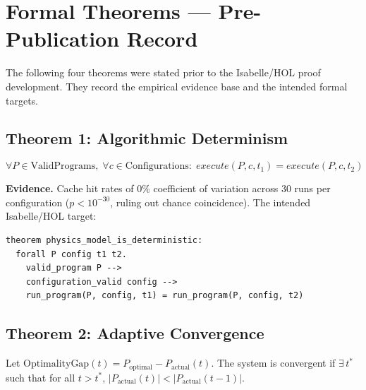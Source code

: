 
\section{Formal Theorems --- Pre-Publication Record}

The following four theorems were stated prior to the Isabelle/HOL proof development.
They record the empirical evidence base and the intended formal targets.

\subsection{Theorem 1: Algorithmic Determinism}

\[
\forall P \in \text{ValidPrograms},\; \forall c \in \text{Configurations}:\;
\textit{execute}(P, c, t_1) = \textit{execute}(P, c, t_2)
\]

\textbf{Evidence.} Cache hit rates of 0\% coefficient of variation across 30 runs
per configuration ($p < 10^{-30}$, ruling out chance coincidence). The intended
Isabelle/HOL target:

\begin{lstlisting}[language=isabelle]
theorem physics_model_is_deterministic:
  forall P config t1 t2.
    valid_program P -->
    configuration_valid config -->
    run_program(P, config, t1) = run_program(P, config, t2)
\end{lstlisting}

\subsection{Theorem 2: Adaptive Convergence}

Let $\text{OptimalityGap}(t) = P_{\text{optimal}} - P_{\text{actual}}(t)$.
The system is convergent if $\exists\, t^*$ such that for all $t > t^*$,
$|P_{\text{actual}}(t)| < |P_{\text{actual}}(t-1)|$.

